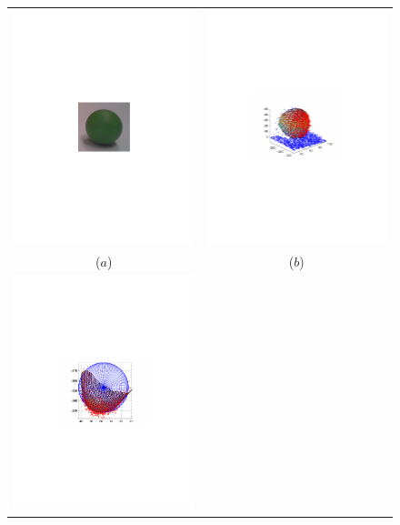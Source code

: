 
\begin{figure}
\begin{center}
\begin{tabular}{cc}
\includegraphics[trim=190 280 190 290,clip,width=0.48\linewidth]{Figures/sphereColor} &
\includegraphics[trim=190 280 190 290,clip,width=0.48\linewidth]{Figures/sphere3DMesh} \\
($a$) & ($b$) \\
\includegraphics[trim=190 280 190 290,clip,width=0.48\linewidth]{Figures/sphere3DMeshWithGT} &

\end{tabular}
\end{center}
\end{figure}
